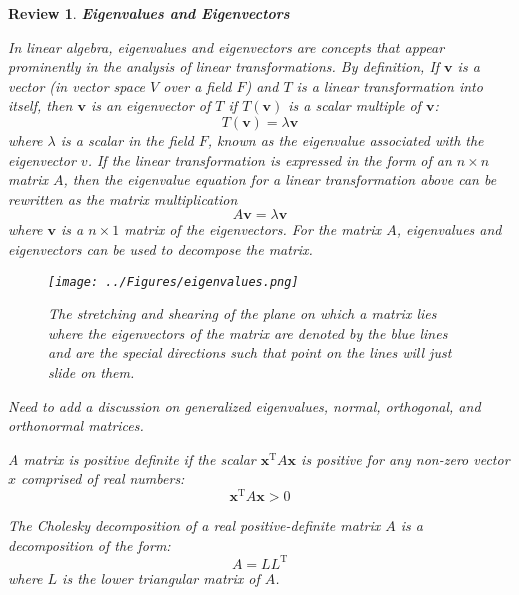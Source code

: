 \documentclass[12pt,letter]{article}
\numberwithin{ex}{section} %
\newtheorem{re}{Review}
\numberwithin{re}{section} %
\newenvironment{review}{\begin{mdframed}[middlelinewidth=2mm,roundcorner=20pt]\begin{re}\normalfont}{\end{re}\end{mdframed}}
\newcommand{\rd}[1]{\textcolor[rgb]{0.75,0.00,0.00}{#1}}
\begin{document}
\begin{review}

	\textbf{Eigenvalues and Eigenvectors}

	In linear algebra, eigenvalues and eigenvectors are concepts that appear prominently in the analysis of linear transformations. By definition, If  $\textbf{v}$ is a vector (in vector space $V$ over a field $F$) and $T$ is a linear transformation into itself, then $\textbf{v}$ is an eigenvector of $T$ if $T(\textbf{v})$ is a scalar multiple of $\textbf{v}$:
	\begin{equation}
	T(\textbf{v}) = \lambda\textbf{v}
	\end{equation}
	where $\lambda$ is a scalar in the field $F$, known as the eigenvalue associated with the eigenvector $v$. If the linear transformation is expressed in the form of an $n \times n$ matrix $A$, then the eigenvalue equation for a linear transformation above can be rewritten as the matrix multiplication
	\begin{equation}
	A\textbf{v} = \lambda\textbf{v}
	\end{equation}
	where $\textbf{v}$ is a $n \times 1$ matrix of the eigenvectors. For the matrix $A$, eigenvalues and eigenvectors can be used to decompose the matrix.

	\begin{figure}[H]
		\centering
		\texttt{[image: ../Figures/eigenvalues.png]}
		\caption{The stretching and shearing of the plane on which a matrix lies where the eigenvectors of the matrix are denoted by the blue lines and are the special directions such that point on the lines will just slide on them.}
		\label{fig:eigenvalues}
	\end{figure}


	\rd{Need to add a discussion on generalized eigenvalues, normal, orthogonal, and orthonormal matrices.}	


	A matrix is positive definite if the scalar $\textbf{x}^{\text{T}}A\textbf{x}$ is positive for any non-zero vector $x$ comprised of real numbers:
	\begin{equation}
	\textbf{x}^{\text{T}}A\textbf{x} > 0
	\end{equation}
	
	The Cholesky decomposition of a real positive-definite matrix $A$ is a decomposition of the form:
	\begin{equation}
	A=LL^{\text{T}}
	\end{equation}
	where $L$ is the lower triangular matrix of $A$.

\end{review}
\end{document}
